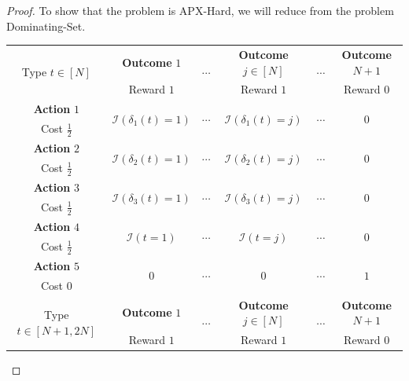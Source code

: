 \documentclass{article}
\newcommand{\indicator}[1]{\mathcal{I}\left(#1\right)}
\newcommand{\DSet}{\textnormal{Dominating-Set}\xspace}
\newcommand{\ApxHard}{\textsc{APX}-Hard\xspace}
\newcommand{\neighbor}[2]{\delta_{#1}\left(#2\right)}%
\begin{document}
\begin{proof}
To show that the problem is \ApxHard, we will reduce from the problem \DSet.

\begin{table}
\centering
\begin{tabular}{cccccc}
  \toprule
  \multirow{2}{*}{Type $t \in [N]$} & \textbf{Outcome} $1$ & \multirow{2}{*}{$\cdots$} & \textbf{Outcome} $j \in [N]$ & \multirow{2}{*}{$\cdots$} & \textbf{Outcome} $N+1$ \\
                                    & Reward $1$           &                           & Reward $1$                   &                           & Reward $0$             \\ \midrule
  \textbf{Action} $1$ & \multirow{2}{*}{$\indicator{\neighbor{1}{t} = 1}$} & \multirow{2}{*}{$\cdots$} & \multirow{2}{*}{$\indicator{\neighbor{1}{t} = j}$} & \multirow{2}{*}{$\cdots$} & \multirow{2}{*}{$0$} \\ Cost $\tfrac12$ \\
  \textbf{Action} $2$ & \multirow{2}{*}{$\indicator{\neighbor{2}{t} = 1}$} & \multirow{2}{*}{$\cdots$} & \multirow{2}{*}{$\indicator{\neighbor{2}{t} = j}$} & \multirow{2}{*}{$\cdots$} & \multirow{2}{*}{$0$} \\ Cost $\tfrac12$ \\
  \textbf{Action} $3$ & \multirow{2}{*}{$\indicator{\neighbor{3}{t} = 1}$} & \multirow{2}{*}{$\cdots$} & \multirow{2}{*}{$\indicator{\neighbor{3}{t} = j}$} & \multirow{2}{*}{$\cdots$} & \multirow{2}{*}{$0$} \\ Cost $\tfrac12$ \\
  \textbf{Action} $4$ & \multirow{2}{*}{$\indicator{t = 1}$} & \multirow{2}{*}{$\cdots$} & \multirow{2}{*}{$\indicator{t = j}$} & \multirow{2}{*}{$\cdots$} & \multirow{2}{*}{$0$} \\ Cost $\tfrac12$ \\
  \textbf{Action} $5$ & \multirow{2}{*}{$0$} & \multirow{2}{*}{$\cdots$} & \multirow{2}{*}{$0$} & \multirow{2}{*}{$\cdots$} & \multirow{2}{*}{$1$} \\ Cost $0$ \\ \midrule
  \multirow{2}{*}{Type $t \in [N+1, 2N]$} & \textbf{Outcome} $1$ & \multirow{2}{*}{$\cdots$} & \textbf{Outcome} $j \in [N]$ & \multirow{2}{*}{$\cdots$} & \textbf{Outcome} $N+1$ \\
                                          & Reward $1$           &                           & Reward $1$                   &                           & Reward $0$             \\ \midrule

\end{tabular}
\end{table}
\end{proof}
\end{document}
